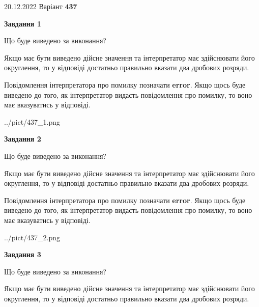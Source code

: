 \documentclass[12pt, ukrainian]{article}
\begin{document}
{20.12.2022 Варіант \No \textbf { 437 }\par}
{
\begin {Large}

{\begin {center}\textbf{Завдання 1}\end {center}}\par
Що буде виведено за виконання? \par

Якщо має бути виведено дійсне значення та інтерпретатор має здійснювати його округлення, 
то у відповіді достатньо правильно вказати два дробових розряди.

Повідомлення інтерпретатора про помилку позначати \textbf{error}.
Якщо щось буде виведено до того, як інтерпретатор видасть повідомлення про помилку, 
то воно має вказуватись у відповіді. \par

\begin{center}
	{../pict/437_1.png}
\end{center}
\newpage

{\begin {center}\textbf{Завдання 2}\end {center}}\par
Що буде виведено за виконання? \par

Якщо має бути виведено дійсне значення та інтерпретатор має здійснювати його округлення, 
то у відповіді достатньо правильно вказати два дробових розряди.

Повідомлення інтерпретатора про помилку позначати \textbf{error}.
Якщо щось буде виведено до того, як інтерпретатор видасть повідомлення про помилку, 
то воно має вказуватись у відповіді. \par

\begin{center}
	{../pict/437_2.png}
\end{center}
\newpage

{\begin {center}\textbf{Завдання 3}\end {center}}\par
Що буде виведено за виконання? \par

Якщо має бути виведено дійсне значення та інтерпретатор має здійснювати його округлення, 
то у відповіді достатньо правильно вказати два дробових розряди.


\end{Large}}
\end{document}
